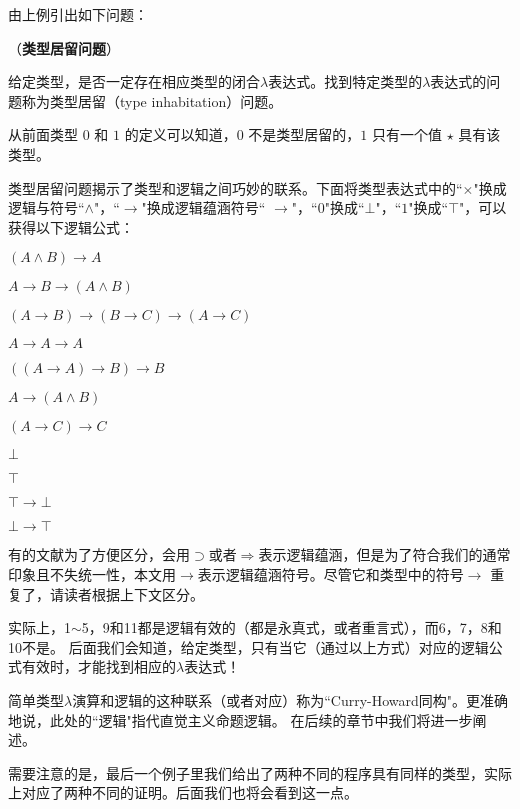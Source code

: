 由上例引出如下问题：

\begin{defn} （\textbf{类型居留问题}）

给定类型，是否一定存在相应类型的闭合$\lambda$表达式。找到特定类型的$\lambda$表达式的问题称为类型居留（type inhabitation）问题。

\end{defn}

从前面类型 $0$ 和 $1$ 的定义可以知道，$0$ 不是类型居留的，$1$ 只有一个值 $\star$ 具有该类型。

类型居留问题揭示了类型和逻辑之间巧妙的联系。下面将类型表达式中的``$\times$"换成逻辑与符号``$\land$"，``$\to$"换成逻辑蕴涵符号`` $\to$"，``$0$"换成``$\bot$"，``$1$"换成``$\top$"，可以获得以下逻辑公式：

\begin{tightenum}
  \item $( A \land B) \to A$
  \item $A \to B \to (A \land B)$
  \item $(A \to B) \to (B \to C) \to (A \to C)$
  \item $A \to A \to A$
  \item $((A \to A) \to B) \to B$
  \item $A \to (A \land B)$
  \item $(A \to C) \to C$
  \item $\bot$
  \item $\top$
  \item $\top \to \bot$
  \item $\bot \to \top$
\end{tightenum}

\begin{rem}
有的文献为了方便区分，会用$\supset$或者$\Rightarrow$表示逻辑蕴涵，但是为了符合我们的通常印象且不失统一性，本文用$\to$表示逻辑蕴涵符号。尽管它和类型中的符号$\to$ 重复了，请读者根据上下文区分。
\end{rem}

实际上，1$\sim$5，9和11都是逻辑有效的（都是永真式，或者重言式），而6，7，8和10不是。
后面我们会知道，给定类型，只有当它（通过以上方式）对应的逻辑公式有效时，才能找到相应的$\lambda$表达式！

简单类型$\lambda$演算和逻辑的这种联系（或者对应）称为``Curry-Howard同构"。更准确地说，此处的``逻辑"指代直觉主义命题逻辑。 在后续的章节中我们将进一步阐述。

需要注意的是，最后一个例子里我们给出了两种不同的程序具有同样的类型，实际上对应了两种不同的证明。后面我们也将会看到这一点。

